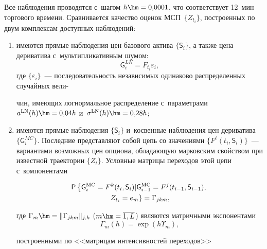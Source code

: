 \begin{multicols}{2}
Все наблюдения проводятся с~шагом $h \hm= 0{,}0001$, что соответствует 12~мин 
торгового времени. Сравнивается качество оценок МСП~$\{Z_{t_i}\}$, построенных 
по  двум комплексам доступных наблюдений:\\[-13pt]
\begin{enumerate}[(1)]
\item
имеются прямые наблюдения цен базового актива $\{\mathsf{S}_i\}$, а также цена 
дериватива с~мультипликативным шумом:
$$
\mathsf{G}_i^{LN} = F_{t_i} \varepsilon_i,
$$
где $\{\varepsilon_i\}$~--- последовательность независимых одинаково 
распределенных случайных вели-\linebreak\vspace*{-12pt}

\columnbreak

\noindent
чин, имеющих логнормальное распределение 
с~параметрами $a^{\mathrm{LN}}(h)\hm = 0{,}04h$ и~$\sigma^{\mathrm{LN}}(h) \hm= 0{,}28h$;\\[-14pt]
\item
имеются прямые наблюдения $\{\mathsf{S}_i\}$ и~косвенные наблюдения цен 
дериватива $\{\mathsf{G}_i^{MC}\}$. Последние представляют собой цепь со 
значениями $\{F^{\ell}(t_i, \mathsf{S}_i)\}$~--- вариантами возможных цен 
опциона, обладающую марковским свойством при известной траектории $\{Z_t\}$. 
Условные мат\-ри\-цы переходов этой цепи с~компонентами

\vspace*{-7pt}

\noindent
\begin{multline*}
{\sf P}\left\{\mathsf{G}_i^{\mathrm{MC}} = F^{k}(t_i, \mathsf{S}_i) | \mathsf{G}_{i-1}^{\mathrm{MC}} = 
F^{j}(t_{i-1},\mathsf{S}_{i-1}),\right.\\ 
\left.Z_{t_i}=e_m\right\} =\Gamma_{jkm},
\end{multline*}

\vspace*{-6pt}

\noindent
где $\Gamma_m \hm= 
\|\Gamma_{jkm}\|_{j,k}$ ($m\hm=\overline{1,L}$) являются мат\-рич\-ны\-ми экспонентами 
$$
\Gamma_m(h) =\exp(h\Upsilon_m),
$$ 

\vspace*{-2pt}

\noindent
построенными по <<матрицам интенсивностей 
переходов>>

\vspace*{-7pt}


\end{enumerate}
\end{multicols}
